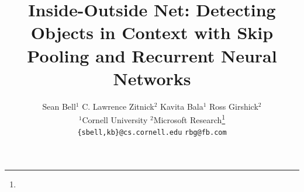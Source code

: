 \documentclass[10pt,twocolumn,letterpaper]{article}
\begin{document}
\title{%
  \vspace{-0.43em}
  Inside-Outside Net:
  Detecting Objects in Context with Skip Pooling and
  Recurrent Neural Networks
  \vspace{-0.43em}
}

\author{%
Sean Bell$^1$
\qquad
C. Lawrence Zitnick$^2$
\qquad
Kavita Bala$^1$
\qquad
Ross Girshick$^2$
\\
$^1$Cornell University
\qquad
$^2$Microsoft Research\thanks{}\\
{\tt\small \{sbell,kb\}@cs.cornell.edu}
\qquad
{\tt\small rbg@fb.com}
}

\maketitle
\end{document}
